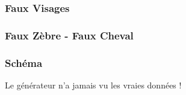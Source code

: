 \begin{frame}
  \frametitle{Faux Visages}
\end{frame}

\begin{frame}
  \frametitle{Faux Zèbre - Faux Cheval}
\end{frame}

\begin{frame}
  \frametitle{Schéma}
  Le générateur n'a jamais vu les vraies données !
\end{frame}

